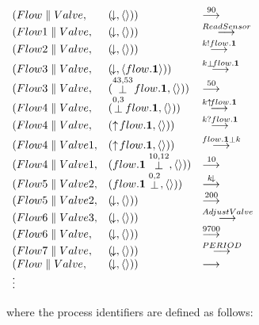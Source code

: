 \begin{figure} 
\begin{center}
\begin{math}
\begin{array}{lll}
(Flow \parallel  Valve,  & (\free,\emq)) & \goes{90} \\
(Flow1 \parallel Valve,  & (\free,\emq)) & \goes{ReadSensor} \\
(Flow2 \parallel Valve,  & (\free,\emq)) & \goes{\kk!flow.\bcuv} \\
(Flow3 \parallel Valve,  & (\free,\langle flow.\bcuv\rangle)) & \goes{\kk\preact{}{flow.\bcuv}} \\
(Flow3 \parallel Valve,  & (\preact{43,53}{flow.\bcuv},\emq)) & \goes{50} \\
(Flow4 \parallel Valve,  & (\preact{0,3}{flow.\bcuv},\emq)) & \goes{\kk\offers{flow.\bcuv}} \\
(Flow4 \parallel Valve,  & (\offers{flow.\bcuv},\emq)) & \goes{\kk?flow.\bcuv} \\
(Flow4 \parallel Valve1, & (\offers{flow.\bcuv},\emq)) & \goes{\postact{}{flow.\bcuv}\kk} \\
(Flow4 \parallel Valve1, & (\postact{10,12}{flow.\bcuv},\emq)) & \goes{10} \\
(Flow5 \parallel Valve2, & (\postact{0,2}{flow.\bcuv},\emq)) & \goes{\kk\free} \\
(Flow5 \parallel Valve2, & (\free,\emq)) & \goes{200} \\
(Flow6 \parallel Valve3, & (\free,\emq)) & \goes{AdjustValve} \\
(Flow6 \parallel Valve,  & (\free,\emq)) & \goes{9700} \\
(Flow7 \parallel Valve,  & (\free,\emq)) & \goes{PERIOD} \\
(Flow  \parallel Valve,  & (\free,\emq)) & \goes{} \\
\vdots & \\
\end{array}
\end{math}
\end{center}

where the process identifiers are defined as follows:


\end{figure}
